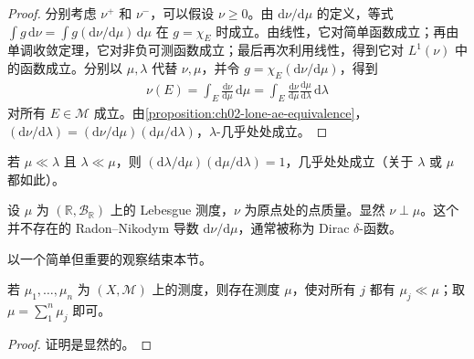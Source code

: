 \documentclass[../../main.tex]{subfiles}%
\begin{document}
\begin{proof}
分别考虑 $\nu^+$ 和 $\nu^-$，可以假设 $\nu\ge0$。由 $\mathrm{d}\nu/\mathrm{d}\mu$ 的定义，等式 $\int g\,\mathrm{d}\nu=\int g(\mathrm{d}\nu/\mathrm{d}\mu)\,\mathrm{d}\mu$ 在 $g=\chi_E$ 时成立。由线性，它对简单函数成立；再由单调收敛定理，它对非负可测函数成立；最后再次利用线性，得到它对 $L^1(\nu)$ 中的函数成立。分别以 $\mu,\lambda$ 代替 $\nu,\mu$，并令 $g=\chi_E(\mathrm{d}\nu/\mathrm{d}\mu)$，得到
\begin{align*}
\nu(E)=\int_E\frac{\mathrm{d}\nu}{\mathrm{d}\mu}\,\mathrm{d}\mu
=\int_E\frac{\mathrm{d}\nu}{\mathrm{d}\mu}\frac{\mathrm{d}\mu}{\mathrm{d}\lambda}\,\mathrm{d}\lambda
\end{align*}
对所有 $E\in\mathscr{M}$ 成立。由\cref{proposition:ch02-lone-ae-equivalence}，$(\mathrm{d}\nu/\mathrm{d}\lambda)=(\mathrm{d}\nu/\mathrm{d}\mu)(\mathrm{d}\mu/\mathrm{d}\lambda)$，$\lambda$-几乎处处成立。
\end{proof}
\begin{corollary}\label{corollary:ch03-radon-nikodym-reciprocal}
若 $\mu\ll\lambda$ 且 $\lambda\ll\mu$，则 $(\mathrm{d}\lambda/\mathrm{d}\mu)(\mathrm{d}\mu/\mathrm{d}\lambda)=1$，几乎处处成立（关于 $\lambda$ 或 $\mu$ 都如此）。
\end{corollary}
\begin{example}\label{example:ch03-dirac-nonexample}
设 $\mu$ 为 $(\mathbb{R},\mathscr{B}_{\mathbb{R}})$ 上的 Lebesgue 测度，$\nu$ 为原点处的点质量。显然 $\nu\perp\mu$。这个并不存在的 Radon–Nikodym 导数 $\mathrm{d}\nu/\mathrm{d}\mu$，通常被称为 Dirac $\delta$-函数。
\end{example}
以一个简单但重要的观察结束本节。
\begin{proposition}\label{proposition:ch03-common-dominating-measure}
若 $\mu_1,\ldots,\mu_n$ 为 $(X,\mathscr{M})$ 上的测度，则存在测度 $\mu$，使对所有 $j$ 都有 $\mu_j\ll\mu$；取 $\mu=\sum_1^n\mu_j$ 即可。
\end{proposition}
\begin{proof}
证明是显然的。
\end{proof}
\end{document}
